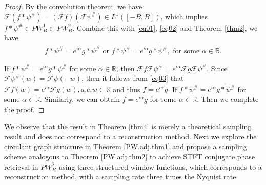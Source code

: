 \documentclass[12pt,oneside,reqno]{amsart}
\newcommand{\R}{\mathbb{R}}
\numberwithin{equation}{section}
\begin{document}
\begin{proof}
	
	By the convolution theorem, we have $\mathcal{F}(f\ast \psi^\#) = (\mathcal{F}f) (\mathcal{F}\psi^\#) \in L^1([-B,B])$, which implies $f\ast \psi^\# \in PW_B^1 \subset PW_B^2$.  Combine this with \eqref{eq01}, \eqref{eq02} and Theorem \ref{thm2}, we have
	\begin{align*}
		f\ast \psi^\# = e^{i\alpha} g\ast \psi^\# \text{ or } f\ast \psi^\# = e^{i\alpha} \overline{g\ast \psi^\#}, \text{ for some } \alpha\in \R.
	\end{align*}
	
	
	If $f\ast \psi^\# = e^{i\alpha} g\ast \psi^\#$ for some $\alpha\in \R$, then $\mathcal{F}f \mathcal{F}\psi^\# = e^{i\alpha} \mathcal{F}g \mathcal{F}\psi^\#$. Since $\mathcal{F} \psi^\# (w) = \mathcal{F}\psi (-w)$, then it follows from \eqref{eq03} that $\mathcal{F}f(w) = e^{i\alpha} \mathcal{F}g(w), a.e. w\in \R$ and thus $f=e^{i\alpha} g$. 
	If $f\ast \psi^\# = e^{i\alpha} \overline{g\ast \psi^\#}$ for some $\alpha\in \R$. Similarly, we can obtain $f= e^{i\alpha} \overline{g}$ for some $\alpha\in \R$. Then we complete the proof.
\end{proof}

We observe that the result in Theorem \ref{thm4} is merely a theoretical sampling result and does not correspond to a reconstruction method. Next  we 
explore the circulant graph structure in Theorem  \ref{PW.adj.thm1} and
propose a sampling scheme analogous to Theorem \ref{PW.adj.thm2} to achieve STFT conjugate phase retrieval in $PW_B^2$ using three structured window functions, which corresponds to a reconstruction method, with a sampling rate three times the Nyquist rate.
\end{document}
